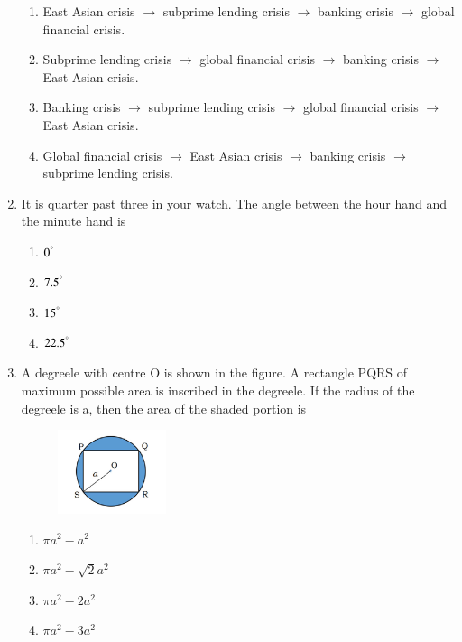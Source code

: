 \documentclass[journal,12pt,onecolumn]{IEEEtran}
\begin{document}
\begin{enumerate}
\hfill{}
\begin{enumerate}
    \item East Asian crisis $\rightarrow$ subprime lending crisis $\rightarrow$ banking crisis $\rightarrow$ global financial crisis.
    \item Subprime lending crisis $\rightarrow$ global financial crisis $\rightarrow$ banking crisis $\rightarrow$ East Asian crisis.
    \item Banking crisis $\rightarrow$ subprime lending crisis $\rightarrow$ global financial crisis $\rightarrow$ East Asian crisis.
    \item Global financial crisis $\rightarrow$ East Asian crisis $\rightarrow$ banking crisis $\rightarrow$ subprime lending crisis.
\end{enumerate}

\item It is quarter past three in your watch. The angle between the hour hand and the minute hand is

\hfill{}
\begin{multicols}{4}
\begin{enumerate}
    \item $0^{\degree}$
    \item $7.5^{\degree}$
    \item $15^{\degree}$
    \item $22.5^{\degree}$
\end{enumerate}
\end{multicols}

\item A degreele with centre O is shown in the figure. A rectangle PQRS of maximum possible area is inscribed in the degreele. If the radius of the degreele is a, then the area of the shaded portion is

\hfill{}
\begin{figure}[h!]
    \centering
    \includegraphics[width=0.3\textwidth]{figs/fig1.png}
    \caption{}
    \label{fig:ga_q8}
\end{figure}
\begin{multicols}{2}
\begin{enumerate}
    \item $\pi a^{2}-a^{2}$
    \item $\pi a^{2}-\sqrt{2}a^{2}$
    \item $\pi a^{2}-2a^{2}$
    \item $\pi a^{2}-3a^{2}$
\end{enumerate}
\end{multicols}


\end{enumerate}
\end{document}
